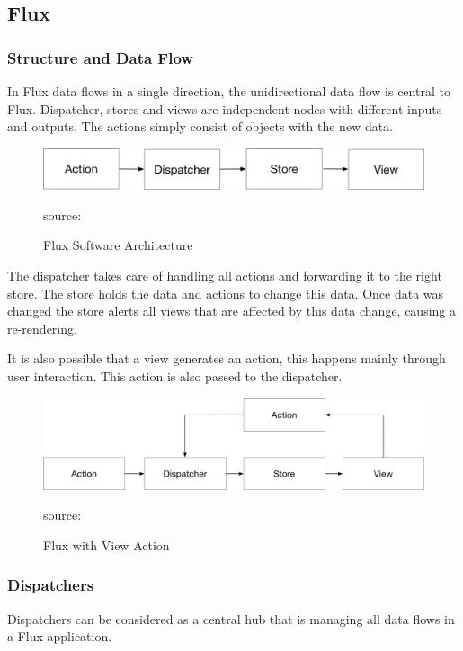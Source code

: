 \subsection{Flux}

\subsubsection{Structure and Data Flow}

In Flux data flows in a single direction, the unidirectional data flow is central to Flux. Dispatcher, stores and views are independent nodes with different inputs and outputs. The actions simply consist of objects with the new data.


\begin{figure}[H]
	\centering
	\includegraphics[width=\linewidth]{bilder/grundlagen/UniDirection.png}
	\caption{Flux Software Architecture} source:\cite{FLUX}
	\label{fig:FLUX}
\end{figure}

The dispatcher takes care of handling all actions and forwarding it to the right store. The store holds the data and actions to change this data. Once data was changed the store alerts all views that are affected by this data change, causing a re-rendering.

It is also possible that a view generates an action, this happens mainly through user interaction. This action is also passed to the dispatcher. 


\begin{figure}[H]
	\centering
	\includegraphics[width=\linewidth]{bilder/grundlagen/uniDirection2.png}
	\caption{Flux with View Action} source:\cite{FluxAction}
	\label{fig:FA}
\end{figure}

\subsubsection{Dispatchers}
Dispatchers can be considered as a central hub that is managing all data flows in a Flux application.

